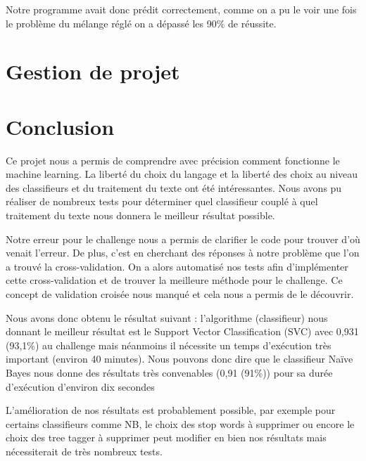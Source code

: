 \documentclass[a4paper]{report}
\begin{document}
        Notre programme avait donc prédit correctement, comme on a pu le voir une fois le problème du mélange réglé on a dépassé les 90\% de réussite.

    \chapter{Gestion de projet}

        

    \chapter{Conclusion}

        Ce projet nous a permis de comprendre avec précision comment fonctionne le machine learning. La liberté du choix du langage et la liberté des choix au niveau des classifieurs et du traitement du texte ont été intéressantes. Nous avons pu réaliser de nombreux tests pour déterminer quel classifieur couplé à quel traitement du texte nous donnera le meilleur résultat possible.

        Notre erreur pour le challenge nous a permis de clarifier le code pour trouver d’où venait l’erreur. De plus, c’est en cherchant des réponses à notre problème que l’on a trouvé la cross-validation. On a alors automatisé nos tests afin d’implémenter cette cross-validation et de trouver la meilleure méthode pour le challenge. Ce concept de validation croisée nous manqué et cela nous a permis de le découvrir.

        Nous avons donc obtenu le résultat suivant : l’algorithme (classifieur) nous donnant le meilleur résultat est le Support Vector Classification (SVC) avec 0,931 (93,1\%) au challenge mais néanmoins il nécessite un temps d'exécution très important (environ 40 minutes).
        Nous pouvons donc dire que le classifieur Naïve Bayes nous donne des résultats très convenables (0,91 (91\%)) pour sa durée d’exécution d’environ dix secondes

        L’amélioration de nos résultats est probablement possible, par exemple pour certains classifieurs comme NB, le choix des stop words à supprimer ou encore le choix des tree tagger à supprimer peut modifier en bien nos résultats mais nécessiterait de très nombreux tests.
\end{document}
